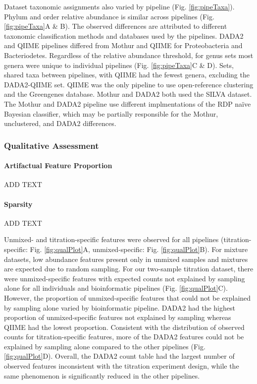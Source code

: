\documentclass[linenumbers]{bmcart}
\begin{document}
Dataset taxonomic assignments also varied by pipeline (Fig.
\ref{fig:pipeTaxa}). Phylum and order relative abundance is similar
across pipelines (Fig. \ref{fig:pipeTaxa}A \& B). The observed
differences are attributed to different taxonomic classification methods
and databases used by the pipelines. DADA2 and QIIME pipelines differed
from Mothur and QIIME for Proteobacteria and Bacteriodetes. Regardless
of the relative abundance threshold, for genus sets most genera were
unique to individual pipelines (Fig. \ref{fig:pipeTaxa}C \& D). Sets,
shared taxa between pipelines, with QIIME had the fewest genera,
excluding the DADA2-QIIME set. QIIME was the only pipeline to use
open-reference clustering and the Greengenes database. Mothur and DADA2
both used the SILVA dataset. The Mothur and DADA2 pipeline use different
implmentations of the RDP naïve Bayesian classifier, which may be
partially responsible for the Mothur, unclustered, and DADA2
differences.

\subsubsection*{Qualitative Assessment}

\paragraph{Artifactual Feature Proportion}
ADD TEXT

\paragraph{Sparsity}
ADD TEXT

Unmixed- and titration-specific features were observed for all pipelines
(titration-specific: Fig. \ref{fig:qualPlot}A, unmixed-specific: Fig.
\ref{fig:qualPlot}B).
For mixture datasets, low abundance features
present only in unmixed samples and mixtures are expected due to random
sampling. For our two-sample titration dataset, there were
unmixed-specific features with expected counts not explained by sampling
alone for all individuals and bioinformatic pipelines (Fig.
\ref{fig:qualPlot}C). However, the proportion of unmixed-specific
features that could not be explained by sampling alone varied by
bioinformatic pipeline. DADA2 had the highest proportion of
unmixed-specific features not explained by sampling whereas QIIME had
the lowest proportion. Consistent with the distribution of observed
counts for titration-specific features, more of the DADA2 features could
not be explained by sampling alone compared to the other pipelines (Fig.
\ref{fig:qualPlot}D). Overall, the DADA2 count table had the largest
number of observed features inconsistent with the titration experiment
design, while the same phenomenon is significantly reduced in the other
pipelines.
\end{document}
